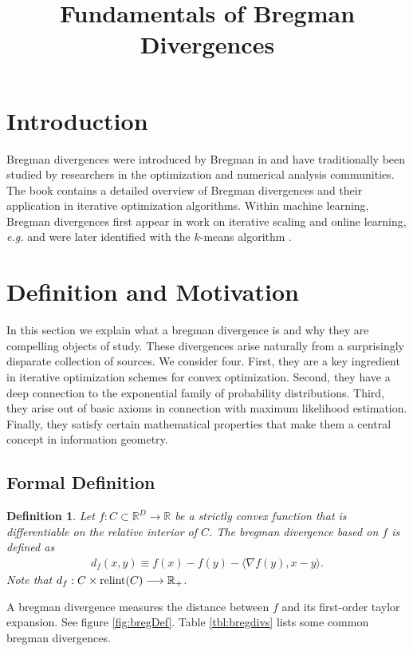 \documentclass{article}
\title{Fundamentals of Bregman Divergences}
\newtheorem{define}{Definition}
\newcommand{\R}{\mathbb{R}}
\newcommand{\relint}{\mbox{\textup{relint}}}
\begin{document}
\maketitle

\section{Introduction}
Bregman divergences were introduced by Bregman in \cite{b.67} and have
traditionally been studied by researchers in the optimization and
numerical analysis communities.  The book \cite{cz.97} contains a
detailed overview of Bregman divergences and their application in
iterative optimization algorithms.  Within machine learning, Bregman
divergences first appear in work on iterative scaling \cite{ldd.97}
and online learning, \textit{e.g.} 
\cite{gls.97,hw.98,aw.01} and were later identified with the $k$-means
algorithm \cite{bm.05}.   

\section{Definition and Motivation}
In this section we explain what a bregman divergence is and why they
are compelling objects of study.  These divergences arise naturally
from a surprisingly disparate collection of sources.  We consider
four.  First, they are a key ingredient in iterative optimization
schemes for convex optimization.  Second, they have a deep connection
to the exponential family of probability distributions.  Third, they
arise out of basic axioms in connection with maximum likelihood
estimation.  Finally, they satisfy certain mathematical properties
that make them a central concept in information geometry.  

\subsection{Formal Definition}
\begin{define}
Let $f:C \subset \R^D \rightarrow \R$ be a strictly convex function that is
differentiable on the relative interior of $C$.  The bregman divergence based
on $f$ is defined as
\begin{align*}
  d_f(x,y) \equiv f(x) - f(y) - \langle \nabla f(y),x-y \rangle.  
\end{align*}
Note that $d_f:C \times \relint(C) \longrightarrow \R_+$.  
\end{define}
A bregman divergence measures the distance between $f$ and its
first-order taylor expansion.  See figure \ref{fig:bregDef}.  Table
\ref{tbl:bregdivs} lists some common bregman divergences.  
\end{document}
